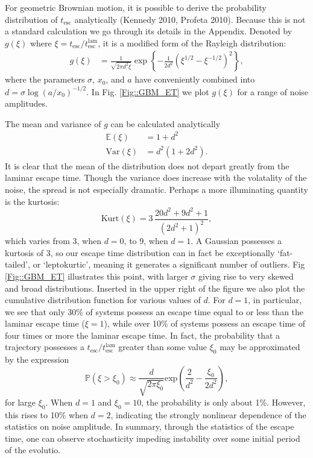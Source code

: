 \documentclass[useAMS]{mn2e}
\begin{document}
For geometric Brownian motion, it is possible to
derive the probability distribution of $t_{\text{esc}}$ analytically (Kennedy 2010, Profeta 2010).
Because this is not a standard calculation we go through its details
in the Appendix. Denoted by $g(\xi)$ where $\xi=t_{\text{esc}}/t_{\text{esc}}^{\text{lam}}$, it is
a modified form of the Rayleigh distribution:
\begin{align}\label{escGBM}
g(\xi)&=\frac{1}{\sqrt{2\pi d^2 \xi}}  
\exp\left\{ -\frac{1}{2d^2}\left(\xi^{1/2}-\xi^{-1/2}\right)^2 \right\},
\end{align}
where the parameters $\sigma$, $x_0$, and $a$ have conveniently combined
into $d=\sigma\log(a/x_0)^{-1/2}$. In Fig. \ref{Fig::GBM_ET}
we plot $g(\xi)$ for a range of noise amplitudes.

The mean and variance of $g$ can be calculated analytically
\begin{align}
\mathbb{E}(\xi)&=1+d^2 \\
\textrm{Var}(\xi)&= d^2(1+ 2d^2).
\end{align}
It is clear that the mean of the distribution does not depart greatly from
the laminar escape time. Though the variance does increase with the
volatality of the noise, the spread is not especially
dramatic. Perhaps a more illuminating quantity is the kurtosis:
\begin{equation}
\text{Kurt}(\xi) = 3\,\frac{20d^2+9d^2+1}{(2d^2+1)^2},
\end{equation}
which varies from 3, when $d=0$, to 9, when $d=1$. A Gaussian
possesses a kurtosis of 3, so our escape time distribution can in fact
be exceptionally `fat-tailed', or `leptokurtic', meaning it generates
a significant number of outliers. Fig \ref{Fig::GBM_ET}
illustrates this point, with larger $\sigma$ giving rise to very
skewed and broad distributions. Inserted in the upper right
of the figure we
also plot the cumulative distribution function for various values of
$d$. For $d=1$, in particular, we see that only 30\% of systems
possess an escape time equal to or less than the laminar escape time ($\xi=1$),
while over 10\% of systems possess an escape time of four times or
more the laminar escape time. In fact, the probability that a
trajectory possesses a $t_{\text{esc}}/ t_{\text{esc}}^{\text{lam}}$ 
greater than some value
$\xi_0 $ may be approximated by the expression
$$ \mathbb{P}(\xi>\xi_0)\approx  \frac{d}{\sqrt{2\pi\xi_0}}
\text{exp}\left(\frac{2}{d^2}-\frac{\xi_0}{2d^2}\right),$$
for large $\xi_0$. When $d=1$ and $\xi_0=10$, the
probability is only about 1\%. However, this rises to 10\% when $d=2$,
indicating the strongly nonlinear dependence of the statistics on
noise amplitude.
In summary, through the statistics of the
escape time, one can observe stochasticity 
impeding instability over some initial period of the evolutio.
\end{document}
